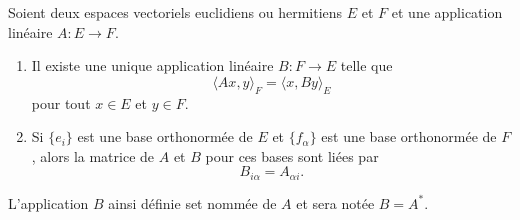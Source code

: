 \begin{propositionDef}\label{DEFooROVNooFlTbSK}
    Soient deux espaces vectoriels euclidiens ou hermitiens \( E\) et \( F\) et une application linéaire \( A\colon E\to F\).
    \begin{enumerate}
        \item       \label{ITEMooRUZWooSZgGnf}
    Il existe une unique application linéaire \( B\colon F\to E\) telle que
    \begin{equation}        \label{EQooHWYKooFzAGgB}
        \langle Ax, y\rangle_F=\langle x, By\rangle_E
    \end{equation}
    pour tout \( x\in E\) et \( y\in F\).
\item   \label{ITEMooXXEUooPtfPKY}
 Si \( \{ e_i \}\) est une base orthonormée de \( E\) et \( \{ f_{\alpha} \}\) est une base orthonormée de \( F\), alors la matrice de \( A\) et \( B\) pour ces bases sont liées par
 \begin{equation}       \label{EQooUSNVooQtRNGL}
     B_{i\alpha}=A_{\alpha i}.
 \end{equation}
    \end{enumerate}
     L'application \( B\) ainsi définie set nommée  de \( A\) et sera notée \( B=A^*\). 
\end{propositionDef}

